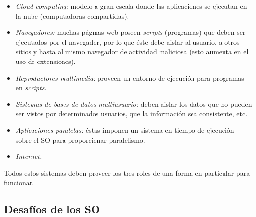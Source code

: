 \documentclass[a4paper,10pt,spanish]{article}
\begin{document}
\begin{itemize}
\item \textit{Cloud computing:} modelo a gran escala donde las aplicaciones se ejecutan en la nube (computadoras compartidas).

\item \textit{Navegadores:} muchas páginas web poseen \textit{scripts} (programas) que deben ser ejecutados por el navegador, por lo que éste debe aislar al usuario, a otros sitios y hasta al mismo navegador de actividad maliciosa (esto aumenta en el uso de extensiones).

\item \textit{Reproductores multimedia:} proveen un entorno de ejecución para programas en \textit{scripts}.

\item \textit{Sistemas de bases de datos multiusuario:} deben aislar los datos que no pueden ser vistos por determinados usuarios, que la información sea consistente, etc.

\item \textit{Aplicaciones paralelas:} éstas imponen un sistema en tiempo de ejecución sobre el SO para proporcionar paralelismo.

\item \textit{Internet.}
\end{itemize}

Todos estos sistemas deben proveer los tres roles de una forma en particular para funcionar.\\

\subsection{Desafíos de los SO}
\end{document}
